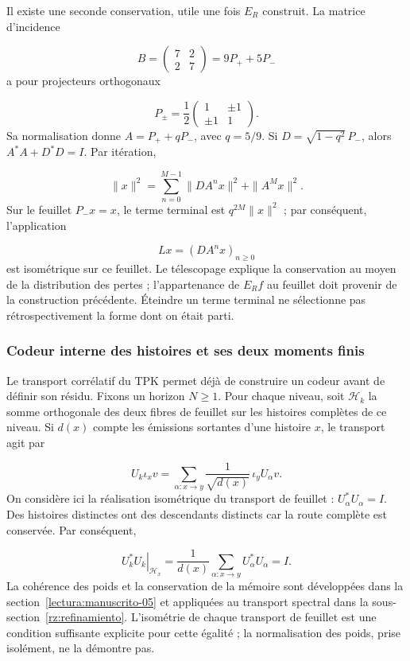 Il existe une seconde conservation, utile une fois \(E_R\) construit. La matrice d'incidence

\[
B=\begin{pmatrix}7&2\\2&7\end{pmatrix}=9P_++5P_-
\]
a pour projecteurs orthogonaux

\[
P_\pm=\frac12
\begin{pmatrix}1&\pm1\\\pm1&1\end{pmatrix}.
\]
Sa normalisation donne \(A=P_++qP_-\), avec \(q=5/9\). Si \(D=\sqrt{1-q^2}\,P_-\), alors \(A^*A+D^*D=I\). Par itération,

\[
\|x\|^2=\sum_{n=0}^{M-1}\|DA^nx\|^2+\|A^Mx\|^2.
\]
Sur le feuillet \(P_-x=x\), le terme terminal est \(q^{2M}\|x\|^2\) ; par conséquent, l'application

\[
Lx=(DA^nx)_{n\geq0}
\]
est isométrique sur ce feuillet. Le télescopage explique la conservation au moyen de la distribution des pertes ; l’appartenance de \(E_Rf\) au feuillet doit provenir de la construction précédente. Éteindre un terme terminal ne sélectionne pas rétrospectivement la forme dont on était parti.

\subsubsection*{Codeur interne des histoires et ses deux moments finis}
Le transport corrélatif du TPK permet déjà de construire un codeur avant de définir son résidu. Fixons un horizon \(N\geq1\). Pour chaque niveau, soit \(\mathscr H_k\) la somme orthogonale des deux fibres de feuillet sur les histoires complètes de ce niveau. Si \(d(x)\) compte les émissions sortantes d'une histoire \(x\), le transport agit par

\[
U_k\iota_xv=
\sum_{\alpha:x\to y}\frac1{\sqrt{d(x)}}\,\iota_yU_\alpha v.
\]
On considère ici la réalisation isométrique du transport de feuillet : \(U_\alpha^*U_\alpha=I\). Des histoires distinctes ont des descendants distincts car la route complète est conservée. Par conséquent,

\[
\left.U_k^*U_k\right|_{\mathscr H_x}
=\frac1{d(x)}\sum_{\alpha:x\to y}U_\alpha^*U_\alpha=I.
\]
La cohérence des poids et la conservation de la mémoire sont développées dans la section~\ref{lectura:manuscrito-05} et appliquées au transport spectral dans la sous-section~\ref{rz:refinamiento}. L'isométrie de chaque transport de feuillet est une condition suffisante explicite pour cette égalité ; la normalisation des poids, prise isolément, ne la démontre pas.

